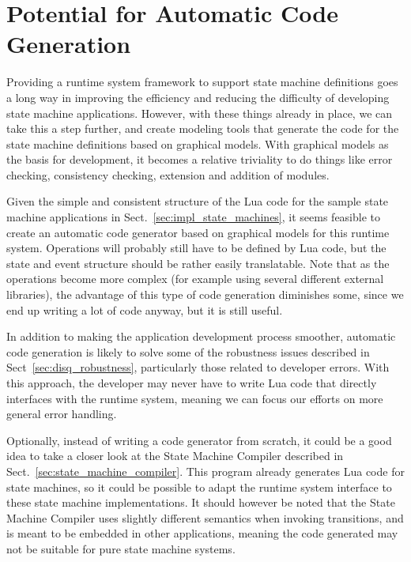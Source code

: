 \section{Potential for Automatic Code Generation}
\label{sec:disq_automatic_code}
Providing a runtime system framework to support state machine definitions goes a long way in improving the efficiency and reducing the difficulty of developing state machine applications. However, with these things already in place, we can take this a step further, and create modeling tools that generate the code for the state machine definitions based on graphical models. With graphical models as the basis for development, it becomes a relative triviality to do things like error checking, consistency checking, extension and addition of modules.

\noindent
Given the simple and consistent structure of the Lua code for the sample state machine applications in Sect.~\ref{sec:impl_state_machines}, it seems feasible to create an automatic code generator based on graphical models for this runtime system. Operations will probably still have to be defined by Lua code, but the state and event structure should be rather easily translatable. Note that as the operations become more complex (for example using several different external libraries), the advantage of this type of code generation diminishes some, since we end up writing a lot of code anyway, but it is still useful.

\noindent
In addition to making the application development process smoother, automatic code generation is likely to solve some of the robustness issues described in Sect~\ref{sec:disq_robustness}, particularly those related to developer errors. With this approach, the developer may never have to write Lua code that directly interfaces with the runtime system, meaning we can focus our efforts on more general error handling.

\noindent
Optionally, instead of writing a code generator from scratch, it could be a good idea to take a closer look at the State Machine Compiler described in Sect.~\ref{sec:state_machine_compiler}. This program already generates Lua code for state machines, so it could be possible to adapt the runtime system interface to these state machine implementations. It should however be noted that the State Machine Compiler uses slightly different semantics when invoking transitions, and is meant to be embedded in other applications, meaning the code generated may not be suitable for pure state machine systems.


